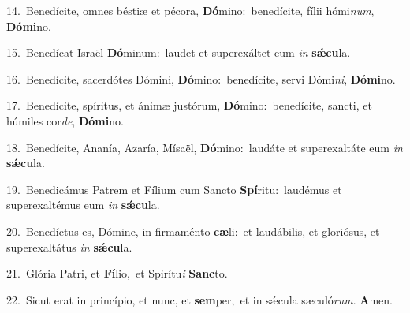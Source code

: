 {\numbfont\textcolor{\numbcolor}{14.}}~Benedícite, omnes béstiæ et pécora, \textbf{Dó}\-mino:~\star benedícite, fílii hómi\-\textit{num}\-, \textbf{Dó}\-\textbf{mi}no.\par
{\numbfont\textcolor{\numbcolor}{15.}}~Benedícat Israël \textbf{Dó}\-minum:~\star laudet et superexáltet eum \textit{in} \textbf{sǽ}\-\textbf{cu}la.\par
{\numbfont\textcolor{\numbcolor}{16.}}~Benedícite, sacerdótes Dómini, \textbf{Dó}\-mino:~\star benedícite, servi Dómi\-\textit{ni}\-, \textbf{Dó}\-\textbf{mi}no.\par
{\numbfont\textcolor{\numbcolor}{17.}}~Benedícite, spíritus, et ánimæ justórum, \textbf{Dó}\-mino:~\star benedícite, sancti, et húmiles cor\-\textit{de}\-, \textbf{Dó}\-\textbf{mi}no.\par
{\numbfont\textcolor{\numbcolor}{18.}}~Benedícite, Ananía, Azaría, Mísaël, \textbf{Dó}\-mino:~\star laudáte et superexaltáte eum \textit{in} \textbf{sǽ}\-\textbf{cu}la.\par
{\numbfont\textcolor{\numbcolor}{19.}}~Benedicámus Patrem et Fílium cum Sancto \textbf{Spí}\-ritu:~\star laudémus et superexaltémus eum \textit{in} \textbf{sǽ}\-\textbf{cu}la.\par
{\numbfont\textcolor{\numbcolor}{20.}}~Benedíctus es, Dómine, in firmaménto \textbf{cæ}\-li:~\star et laudábilis, et gloriósus, et superexaltátus \textit{in} \textbf{sǽ}\-\textbf{cu}la.\par
{\numbfont\textcolor{\numbcolor}{21.}}~Glória Patri, et \textbf{Fí}\-lio,~\star et Spirítu\textit{i} \textbf{Sanc}\-to.\par
{\numbfont\textcolor{\numbcolor}{22.}}~Sicut erat in princípio, et nunc, et \textbf{sem}\-per,~\star et in sǽcula sæculó\-\textit{rum}\-. \textbf{A}\-men.\par

